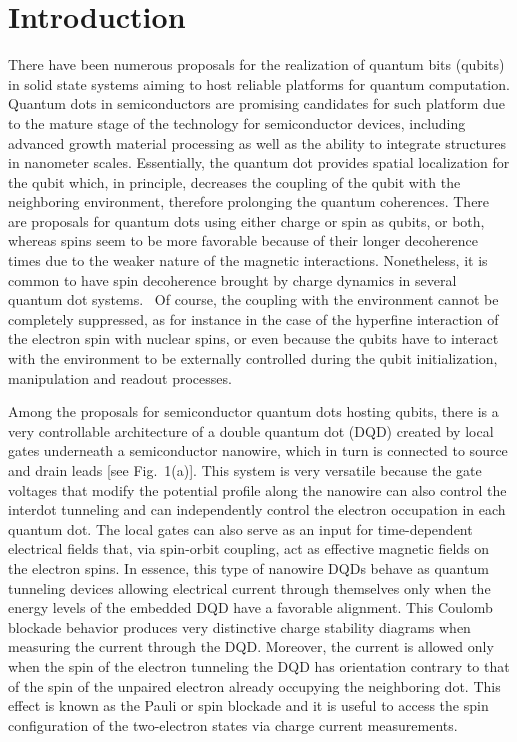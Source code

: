 \documentclass[prb,twocolumn,showpacs,floats]{revtex4}
\begin{document}
\section{Introduction}
\label{intro}

There have been numerous proposals for the realization of quantum bits (qubits) in solid state systems aiming 
to host reliable platforms for quantum computation.\cite{supercond-qubit, petta-dots, NV-qubit}
Quantum dots in semiconductors are promising candidates for such platform due to the mature stage
of the technology for semiconductor devices, including advanced growth material processing as well as the ability to integrate 
structures in nanometer scales. Essentially, the quantum dot provides spatial localization for the qubit
 which, in principle, decreases the coupling of the qubit with the neighboring environment, 
 therefore prolonging the quantum coherences. 
There are proposals for quantum dots using either charge\cite{e-charge} or spin\cite{e-spin, e-spin2} 
as qubits, or both,\cite{shi} whereas spins seem to be more 
favorable because of their longer decoherence times due to the weaker nature of the magnetic interactions.
Nonetheless, it is common to have spin decoherence
brought by charge dynamics in several quantum dot systems.~\cite{hugo}
Of course, the coupling with the environment cannot be completely suppressed, as for instance in the case
of the hyperfine interaction of the electron spin with nuclear spins,\cite{koppens}
 or even because the qubits have to interact with the environment to be externally controlled during the qubit initialization, manipulation and readout processes.

Among the proposals for semiconductor quantum dots hosting qubits,\cite{petta-dots} there is
a very controllable architecture of a double quantum dot (DQD)
created by local gates underneath a semiconductor nanowire,\cite{nanowire-dots, petta-prl,nadj} 
which in turn is connected to source and drain
leads [see Fig.~1(a)]. This system is very versatile because the gate voltages that modify
the potential profile along the nanowire can also control the interdot tunneling and can independently control
the electron occupation in each quantum dot. The local gates can also serve as an input for time-dependent electrical fields that, 
via spin-orbit coupling, act as effective magnetic fields on the electron spins.\cite{nadj} 
In essence, this type of nanowire DQDs behave as 
quantum tunneling devices allowing electrical current through themselves
only when the energy levels of the embedded DQD have a favorable alignment. 
This Coulomb blockade behavior produces very distinctive charge
stability diagrams when measuring the current through the DQD.\cite{petta-prl}
  Moreover, the current is allowed only 
when the spin of the electron tunneling the DQD has orientation contrary to that of the spin of the 
unpaired electron already occupying the neighboring dot. This effect is known as the Pauli or spin blockade\cite{spin-block}
 and it is useful to access the spin configuration of the two-electron states via charge current measurements.
\end{document}
